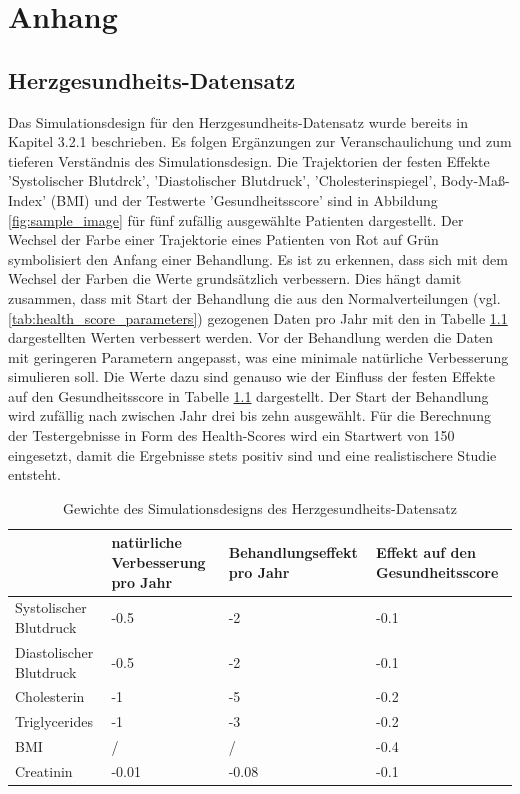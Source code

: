 \documentclass[%
thesis=student,%
coverpage=false,%
titlepage=false,%
headmarks=true, %
german,%
font=libertine, %
math=newpxtx, %
BCOR=5mm,%
coverBCOR=11mm%
]{tumbook}
\theoremstyle{break}
\begin{document}
\chapter{Anhang}
\section{Herzgesundheits-Datensatz}
Das Simulationsdesign für den Herzgesundheits-Datensatz wurde bereits in Kapitel 3.2.1 beschrieben. Es folgen Ergänzungen zur Veranschaulichung und zum tieferen Verständnis des Simulationsdesign. Die Trajektorien der festen Effekte 'Systolischer Blutdrck', 'Diastolischer Blutdruck', 'Cholesterinspiegel', Body-Maß-Index' (BMI) und der Testwerte 'Gesundheitsscore' sind in Abbildung \ref{fig:sample_image} für fünf zufällig ausgewählte Patienten dargestellt. Der Wechsel der Farbe einer Trajektorie eines Patienten von Rot auf Grün symbolisiert den Anfang einer Behandlung. Es ist zu erkennen, dass sich mit dem Wechsel der Farben die Werte grundsätzlich verbessern. Dies hängt damit zusammen, dass mit Start der Behandlung die aus den Normalverteilungen (vgl. \ref{tab:health_score_parameters}) gezogenen Daten pro Jahr mit den in Tabelle \ref{tab:weights} dargestellten Werten verbessert werden. Vor der Behandlung werden die Daten mit geringeren Parametern angepasst, was eine minimale natürliche Verbesserung simulieren soll. Die Werte dazu sind genauso wie der Einfluss der festen Effekte auf den Gesundheitsscore in Tabelle \ref{tab:weights} dargestellt. Der Start der Behandlung wird zufällig nach zwischen Jahr drei bis zehn ausgewählt. Für die Berechnung der Testergebnisse in Form des Health-Scores wird ein Startwert von 150 eingesetzt, damit die Ergebnisse stets positiv sind und eine realistischere Studie entsteht. 
\begin{table}[H]
	\centering
	\begin{tabular}{|p{3cm}|p{3cm}|p{3cm}|p{3cm}|}
		\hline
		&  natürliche Verbesserung pro Jahr &  Behandlungseffekt pro Jahr &  Effekt auf den Gesundheitsscore \\
		\hline
		Systolischer Blutdruck & -0.5 &  -2 &  -0.1 \\
		\hline
		Diastolischer Blutdruck &  -0.5 &  -2 &  -0.1 \\
		\hline
		Cholesterin &  -1 &  -5 &  -0.2 \\
		\hline
		Triglycerides &  -1 &  -3 &  -0.2 \\
		\hline
		BMI &  / &  / &  -0.4 \\
		\hline
		Creatinin &  -0.01 &  -0.08 &  -0.1 \\
		\hline
	\end{tabular}
	\caption{Gewichte des Simulationsdesigns des Herzgesundheits-Datensatz}
	\label{tab:weights}
\end{table}
\end{document}
